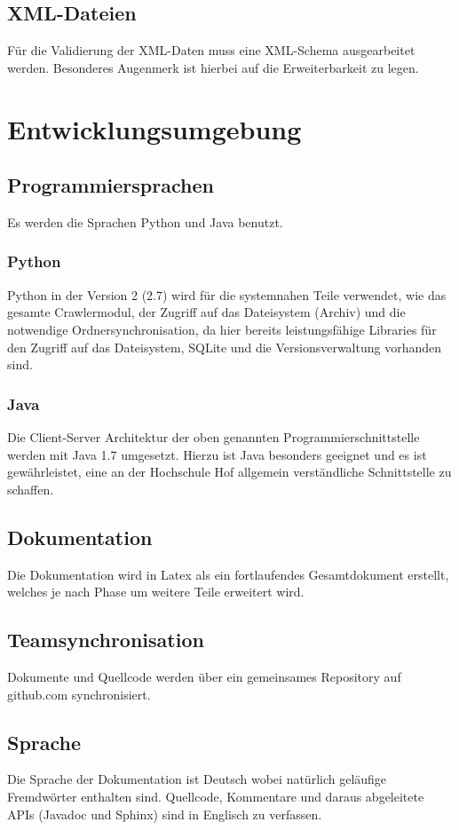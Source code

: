 \section{XML-Dateien} \label{spec:req:xml}
	Für die Validierung der XML-Daten muss eine XML-Schema ausgearbeitet werden.
	Besonderes Augenmerk ist hierbei auf die Erweiterbarkeit zu legen.

\chapter{Entwicklungsumgebung} \label{spec:req:devenv}
\section{Programmiersprachen}
	Es werden die Sprachen Python und Java benutzt.
	\subsection{Python}
		Python in der Version 2 (2.7) wird für die systemnahen Teile verwendet, wie das gesamte Crawlermodul, 
		der Zugriff auf das Dateisystem (Archiv) und die notwendige Ordnersynchronisation, 
		da hier bereits leistungsfähige Libraries für den Zugriff auf das Dateisystem, SQLite und die Versionsverwaltung vorhanden sind.
	\subsection{Java}
		Die Client-Server Architektur der oben genannten Programmierschnittstelle werden mit Java 1.7 umgesetzt.
		Hierzu ist Java besonders geeignet und es ist gewährleistet, eine an der Hochschule Hof allgemein verständliche
		Schnittstelle zu schaffen.
\section{Dokumentation}
	Die Dokumentation wird in Latex als ein fortlaufendes Gesamtdokument erstellt, welches je nach Phase um weitere Teile erweitert wird.
\section{Teamsynchronisation}
	Dokumente und Quellcode werden über ein gemeinsames Repository auf github.com synchronisiert.
\section{Sprache}	
	Die Sprache der Dokumentation ist Deutsch wobei natürlich geläufige Fremdwörter enthalten sind. Quellcode, Kommentare und daraus abgeleitete APIs (Javadoc und Sphinx) sind in Englisch zu verfassen.

